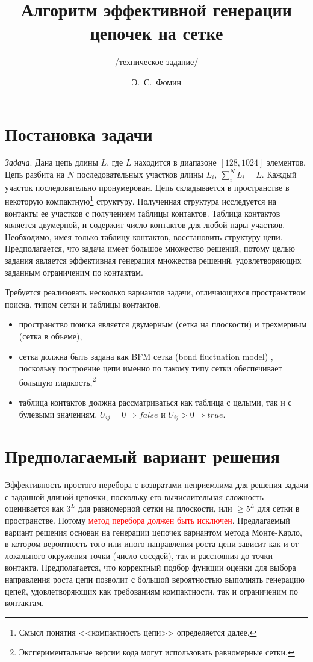 \documentclass[tikz,a4paper]{scrartcl} %
\begin{document}
\title{Алгоритм эффективной генерации цепочек на сетке}
\subtitle{/техническое задание/}
\author{Э.~С.~Фомин}
\date{} %
\maketitle
\large %


\section*{Постановка задачи}
\textit{Задача}. Дана цепь длины $L$, где $L$ находится в диапазоне $[128, 1024]$ элементов. Цепь разбита на $N$ последовательных участков длины $L_i$, $\sum_i^N L_i = L$. Каждый участок последовательно пронумерован. Цепь складывается в пространстве в некоторую компактную\footnote{Смысл понятия <<компактность цепи>> определяется далее.} структуру. Полученная структура исследуется на контакты ее участков с получением таблицы контактов. Таблица контактов является двумерной, и содержит число контактов для любой пары участков. Необходимо, имея только таблицу контактов, восстановить структуру цепи. Предполагается, что задача имеет большое множество решений, потому целью задания является эффективная генерация множества решений, удовлетворяющих заданным ограниченим по контактам.

Требуется реализовать несколько вариантов задачи, отличающихся пространством поиска, типом сетки и таблицы контактов.
\begin{itemize}
\item пространство поиска является двумерным (сетка на плоскости) и трехмерным (сетка в объеме),
\item сетка должна быть задана как BFM сетка (bond fluctuation model) \cite{BMF1994}, поскольку построение цепи именно по такому типу сетки обеспечивает большую гладкость,\footnote {Экспериментальные версии кода могут использовать равномерные сетки.}
\item таблица контактов должна рассматриваться как таблица с целыми, так и с булевыми значениям, $U_{ij} = 0 \Rightarrow false$ и $U_{ij} > 0 \Rightarrow true$.
\end{itemize}

\section*{Предполагаемый вариант решения}
Эффективность простого перебора с возвратами неприемлима для решения задачи с заданной длиной цепочки, поскольку его вычислительная сложность оценивается как $3^L$ для равномерной сетки на плоскости, или $\geq 5^L$ для сетки в пространстве. Потому \textcolor{red} {метод перебора должен быть исключен}. Предлагаемый вариант решения основан на генерации цепочек вариантом метода Монте-Карло, в котором вероятность того или иного направления роста цепи зависит как и от локального окружения точки (число соседей), так и расстояния до точки контакта. Предполагается, что корректный подбор функции оценки для выбора направления роста цепи позволит с большой вероятностью выполнять генерацию цепей, удовлетворяющих как требованиям компактности, так и ограниченим по контактам.
\end{document}
